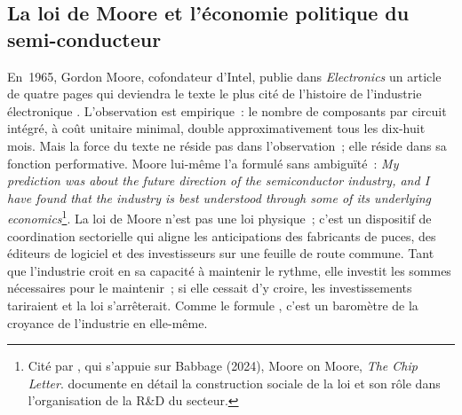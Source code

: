 

\subsection{La loi de Moore et l'économie politique du semi-conducteur}\label{subsec:moore_law}

%
En~1965, Gordon Moore, cofondateur d'Intel, publie dans \emph{Electronics} un article de quatre pages qui deviendra le texte le plus cité de l'histoire de l'industrie électronique \parencite{moore_cramming_1965}. L'observation est empirique~: le nombre de composants par circuit intégré, à coût unitaire minimal, double approximativement tous les dix-huit mois. Mais la force du texte ne réside pas dans l'observation~; elle réside dans sa fonction performative. Moore lui-même l'a formulé sans ambiguïté~: \og \emph{My prediction was about the future direction of the semiconductor industry, and I have found that the industry is best understood through some of its underlying economics}\fg{}\footnote{Cité par \textcite{roussilhe_phase_2025}, qui s'appuie sur Babbage (2024), \og Moore on Moore\fg{}, \emph{The Chip Letter}. \textcite{mody2017moores} documente en détail la construction sociale de la \og loi\fg{} et son rôle dans l'organisation de la R\&D du secteur.}. La \og loi\fg{} de Moore n'est pas une loi physique~; c'est un dispositif de coordination sectorielle qui aligne les anticipations des fabricants de puces, des éditeurs de logiciel et des investisseurs sur une feuille de route commune. Tant que l'industrie croit en sa capacité à maintenir le rythme, elle investit les sommes nécessaires pour le maintenir~; si elle cessait d'y croire, les investissements tariraient et la \og loi\fg{} s'arrêterait. Comme le formule \textcite{roussilhe_phase_2025}, c'est un \og baromètre de la croyance de l'industrie en elle-même\fg{}.

